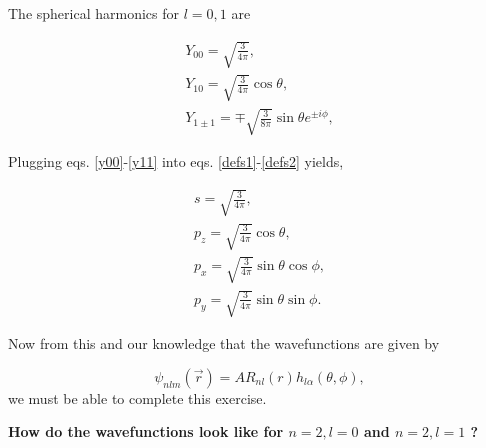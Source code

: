 \begin{questions}
\begin{solution}
  The spherical harmonics for $l=0,1$ are

  \begin{eqnarray}
      Y_{00} = \sqrt{\frac{3}{4\pi}}, \qquad \qquad \quad \label{y00}\\
      Y_{10} = \sqrt{\frac{3}{4\pi}}\cos{\theta}, \qquad \quad \label{y10}\\
      Y_{1\pm1}= \mp \sqrt{\frac{3}{8\pi}}\sin{\theta}e^{\pm i\phi}, \label{y11}
  \end{eqnarray}

  Plugging eqs. \ref{y00}-\ref{y11} into eqs. \ref{defs1}-\ref{defs2} yields,

  \begin{eqnarray}
      s = \sqrt{\frac{3}{4\pi}}, \qquad \quad \quad\\
      p_z = \sqrt{\frac{3}{4\pi}}\cos{\theta}, \qquad\\
      p_x= \sqrt{\frac{3}{4\pi}}\sin{\theta}\cos{\phi},\\
      p_y = \sqrt{\frac{3}{4\pi}}\sin{\theta}\sin{\phi}.
  \end{eqnarray}

  Now from this and our knowledge that the wavefunctions are given by

  \begin{equation}
    \psi_{nlm}(\vec{r}) =A R_{nl}(r)h_{l\alpha}(\theta,\phi),
  \end{equation}
  we must be able to complete this exercise.

  \textbf{How do the wavefunctions look like for $n=2,l=0$ and $n=2,l=1$ ?}


\end{solution}
\end{questions}
